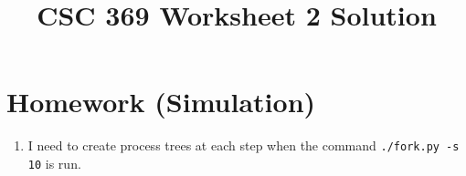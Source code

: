 \documentclass[12pt]{article}
\begin{document}
\title{CSC 369 Worksheet 2 Solution}

\maketitle

\bigskip

\section{Homework (Simulation)}

\begin{enumerate}[1.]
    \item

    \bigskip

    I need to create process trees at each step when the command
    \texttt{./fork.py -s 10} is run.

    \bigskip


\end{enumerate}
\end{document}
